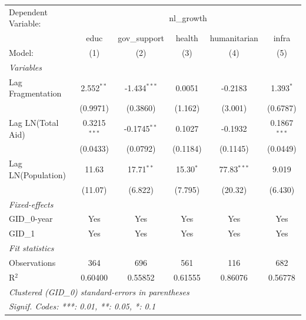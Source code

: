 \begingroup
\centering
\begin{tabular}{lccccc}
   \tabularnewline \midrule \midrule
   Dependent Variable: & \multicolumn{5}{c}{nl\_growth}\\
                      & educ           & gov\_support   & health      & humanitarian  & infra \\   
   Model:             & (1)            & (2)            & (3)         & (4)           & (5)\\  
   \midrule
   \emph{Variables}\\
   Lag Fragmentation  & 2.552$^{**}$   & -1.434$^{***}$ & 0.0051      & -0.2183       & 1.393$^{*}$\\   
                      & (0.9971)       & (0.3860)       & (1.162)     & (3.001)       & (0.6787)\\   
   Lag LN(Total Aid)  & 0.3215$^{***}$ & -0.1745$^{**}$ & 0.1027      & -0.1932       & 0.1867$^{***}$\\   
                      & (0.0433)       & (0.0792)       & (0.1184)    & (0.1145)      & (0.0449)\\   
   Lag LN(Population) & 11.63          & 17.71$^{**}$   & 15.30$^{*}$ & 77.83$^{***}$ & 9.019\\   
                      & (11.07)        & (6.822)        & (7.795)     & (20.32)       & (6.430)\\   
   \midrule
   \emph{Fixed-effects}\\
   GID\_0-year        & Yes            & Yes            & Yes         & Yes           & Yes\\  
   GID\_1             & Yes            & Yes            & Yes         & Yes           & Yes\\  
   \midrule
   \emph{Fit statistics}\\
   Observations       & 364            & 696            & 561         & 116           & 682\\  
   R$^2$              & 0.60400        & 0.55852        & 0.61555     & 0.86076       & 0.56778\\  
   \midrule \midrule
   \multicolumn{6}{l}{\emph{Clustered (GID\_0) standard-errors in parentheses}}\\
   \multicolumn{6}{l}{\emph{Signif. Codes: ***: 0.01, **: 0.05, *: 0.1}}\\
\end{tabular}
\par\endgroup



